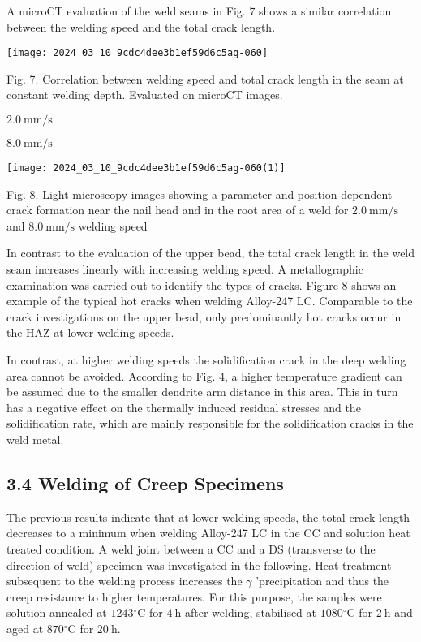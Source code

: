 \documentclass[10pt]{article}
\begin{document}
A microCT evaluation of the weld seams in Fig. 7 shows a similar correlation between the welding speed and the total crack length.

\begin{center}
\texttt{[image: 2024\_03\_10\_9cdc4dee3b1ef59d6c5ag-060]}
\end{center}

Fig. 7. Correlation between welding speed and total crack length in the seam at constant welding depth. Evaluated on microCT images.

$2.0 \mathrm{~mm} / \mathrm{s}$

$8.0 \mathrm{~mm} / \mathrm{s}$

\begin{center}
\texttt{[image: 2024\_03\_10\_9cdc4dee3b1ef59d6c5ag-060(1)]}
\end{center}

Fig. 8. Light microscopy images showing a parameter and position dependent crack formation near the nail head and in the root area of a weld for $2.0 \mathrm{~mm} / \mathrm{s}$ and $8.0 \mathrm{~mm} / \mathrm{s}$ welding speed

In contrast to the evaluation of the upper bead, the total crack length in the weld seam increases linearly with increasing welding speed. A metallographic examination was carried out to identify the types of cracks. Figure 8 shows an example of the typical hot cracks when welding Alloy-247 LC. Comparable to the crack investigations on the upper bead, only predominantly hot cracks occur in the HAZ at lower welding speeds.

In contrast, at higher welding speeds the solidification crack in the deep welding area cannot be avoided. According to Fig. 4, a higher temperature gradient can be assumed due to the smaller dendrite arm distance in this area. This in turn has a negative effect on the thermally induced residual stresses and the solidification rate, which are mainly responsible for the solidification cracks in the weld metal.

\subsection*{3.4 Welding of Creep Specimens}
The previous results indicate that at lower welding speeds, the total crack length decreases to a minimum when welding Alloy-247 LC in the CC and solution heat treated condition. A weld joint between a CC and a DS (transverse to the direction of weld) specimen was investigated in the following. Heat treatment subsequent to the welding process increases the $\gamma$ 'precipitation and thus the creep resistance to higher temperatures. For this purpose, the samples were solution annealed at $1243{ }^{\circ} \mathrm{C}$ for $4 \mathrm{~h}$ after welding, stabilised at $1080{ }^{\circ} \mathrm{C}$ for $2 \mathrm{~h}$ and aged at $870{ }^{\circ} \mathrm{C}$ for $20 \mathrm{~h}$.
\end{document}
